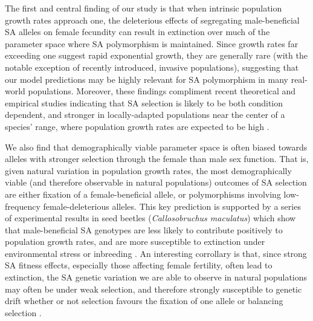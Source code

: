\documentclass[11pt]{article}
\begin{document}
The first and central finding of our study is that when intrinsic population growth rates approach one, the deleterious effects of segregating male-beneficial SA alleles on female fecundity can result in extinction over much of the parameter space where SA polymorphism is maintained. Since growth rates far exceeding one suggest rapid exponential growth, they are generally rare (with the notable exception of recently introduced, invasive populations), suggesting that our model predictions may be highly relevant for SA polymorphism in many real-world populations. Moreover, these findings compliment recent theoretical and empirical studies indicating that SA selection is likely to be both condition dependent, and stronger in locally-adapted populations near the center of a species' range, where population growth rates are expected to be high \citep{BergerEtAl2014, Connallon2015}.

We also find that demographically viable parameter space is often biased towards alleles with stronger selection through the female than male sex function. That is, given natural variation in population growth rates, the most demographically viable (and therefore observable in natural populations) outcomes of SA selection are either fixation of a female-beneficial allele, or polymorphisms involving low-frequency female-deleterious alleles. This key prediction is supported by a series of experimental results in seed beetles ({\itshape Callosobruchus maculatus}) which show that male-beneficial SA genotypes are less likely to contribute positively to population growth rates, and are more susceptible to extinction under environmental stress or inbreeding \citep{BergerEtAl2014, berger2016intralocus, grieshop2017male}. An interesting corrollary is that, since strong SA fitness effects, especially those affecting female fertility, often lead to extinction, the SA genetic variation we are able to observe in natural populations may often be under weak selection, and therefore strongly susceptible to genetic drift whether or not selection favours the fixation of one allele or balancing selection \citep{ConnallonClark2012}. 
\end{document}

